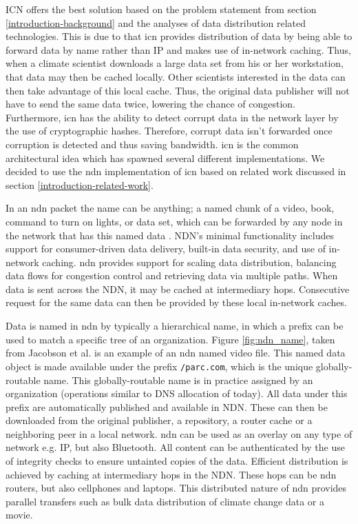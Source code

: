 ICN offers the best solution based on the problem statement from section \ref{introduction-background} and the analyses of data distribution related technologies. This is due to that \gls{icn} provides distribution of data by being able to forward data by name rather than IP and makes use of in-network caching. Thus, when a climate scientist downloads a large data set from his or her workstation, that data may then be cached locally. Other scientists interested in the data can then take advantage of this local cache. Thus, the original data publisher will not have to send the same data twice, lowering the chance of congestion. Furthermore, \gls{icn} has the ability to detect corrupt data in the network layer by the use of cryptographic hashes. Therefore, corrupt data isn't forwarded once corruption is detected and thus saving bandwidth. \gls{icn} is the common architectural idea which has spawned several different implementations. We decided to use the \gls{ndn} \cite{ndn-summary} implementation of \gls{icn} based on related work discussed in section \ref{introduction-related-work}.

\label{overview-ndn}
In an \gls{ndn} packet the name can be anything; a named chunk of a video, book, command to turn on lights, or data set, which can be forwarded by any node in the network that has this named data \cite{ndn-faq}. NDN’s minimal functionality includes support for consumer-driven data delivery, built-in data security, and use of in-network caching. \gls{ndn} provides support for scaling data distribution, balancing data flows for congestion control and retrieving data via multiple paths. When data is sent across the NDN, it may be cached at intermediary hops. Consecutive request for the same data can then be provided by these local in-network caches.

Data is named in \gls{ndn} by typically a hierarchical name, in which a prefix can be used to match a specific tree of an organization. Figure \ref{fig:ndn_name}, taken from Jacobson et al. \cite{jacobson2009networking} is an example of an \gls{ndn} named video file. This named data object is made available under the prefix \texttt{/parc.com}, which is the unique globally-routable name. This globally-routable name is in practice assigned by an organization (operations similar to DNS allocation of today). All data under this prefix are automatically published and available in NDN. These can then be downloaded from the original publisher, a repository, a router cache or a neighboring peer in a local network. \gls{ndn} can be used as an overlay on any type of network e.g. IP, but also Bluetooth. All content can be authenticated by the use of integrity checks to ensure untainted copies of the data. Efficient distribution is achieved by caching at intermediary hops in the NDN. These hops can be \gls{ndn} routers, but also cellphones and laptops. This distributed nature of \gls{ndn} provides parallel transfers such as bulk data distribution of climate change data or a movie.

